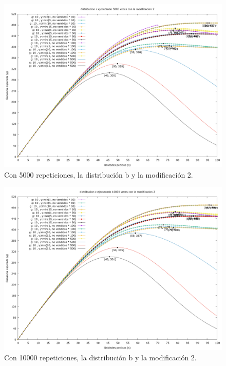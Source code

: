 \documentclass[12pt, spanish]{article}
\begin{document}
\begin{figure}[H]
	\centering
	\includegraphics[scale = 0.2]{prob_c/datos_c_5000_2.png}
	\caption{Con 5000 repeticiones, la distribución b y la modificación 2.}
	\label{fig:ej1_a_5000}

\end{figure}


\begin{figure}[H]
	\centering
	\includegraphics[scale = 0.2]{prob_c/datos_c_10000_2.png}
	\caption{Con 10000 repeticiones, la distribución b y la modificación 2.}
	\label{fig:ej1_a_10000}

\end{figure}
\end{document}
